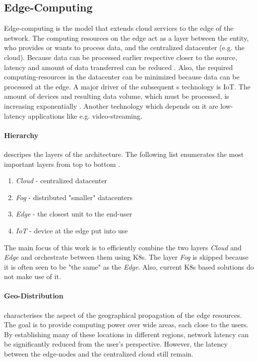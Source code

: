 \documentclass[MSC,Master,english]{twbook}%
\begin{document}
\subsection{Edge-Computing}
Edge-computing is the model that extends cloud services to the edge of the
network. The computing resources on the edge act as a layer between the entity, who provides or wants to process data, and the centralized datacenter (e.g. the cloud). Because data can be processed earlier respective closer to the source, latency and amount of data transferred can be reduced \cite{intro-edge}. Also, the required computing-resources in the datacenter can be minimized because data can be processed at the edge. A major driver of the subsequent s technology is \ac{IoT}. The amount of devices and resulting data volume, which must be processed, is increasing exponentially \cite{SotE21}. Another technology which depends on it are low-latency applications like e.g. video-streaming. 

\paragraph{Hierarchy} descripes the layers of the architecture. The following list enumerates the most important layers from top to bottom \cite{intro-edge}.
\begin{enumerate}
    \item \textit{Cloud} - centralized datacenter
    \item \textit{Fog} - distributed "smaller" datacenters
    \item \textit{Edge} - the closest unit to the end-user
    \item \textit{\ac{IoT}} - device at the edge put into use
\end{enumerate}


The main focus of this work is to efficiently combine the two layers \textit{Cloud} and \textit{Edge} and orchestrate between them using \ac{K8s}. The layer \textit{Fog} is skipped because it is often seen to be "the same" as the \textit{Edge}. Also, current \ac{K8s} based solutions do not make use of it. 

\paragraph{Geo-Distribution} characterises the aspect of the geographical propagation of the edge resources. The goal is to provide computing power over wide areas, each close to the users. By establishing many of these locations in different regions, network latency can be significantly reduced from the user's perspective. However, the latency between the edge-nodes and the centralized cloud still remain.
\end{document}
